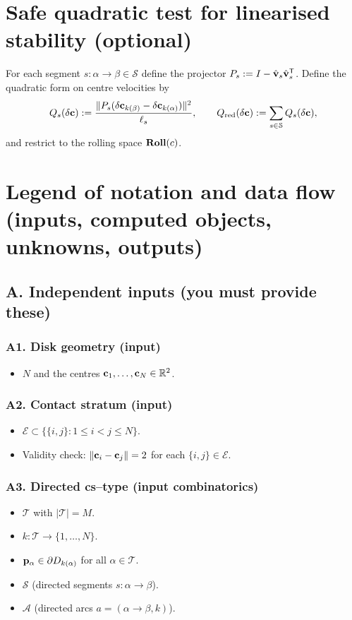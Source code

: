 \documentclass[12pt,letterpaper]{amsart}
\theoremstyle{definition}
\theoremstyle{remark}
\newcommand{\Roll}{\text{\rm \bf Roll}}
\newcommand{\R}{{\mathbb{R}}}
\begin{document}
\section{Safe quadratic test for linearised stability (optional)}

For each segment $s:\alpha\to\beta\in\mathcal S$ define the projector $P_s:=I-\hat{\bf v}_s\hat{\bf v}_s^\mathsf T$.
Define the quadratic form on centre velocities by
\[
Q_s(\delta{\bf c}):=\frac{\|P_s(\delta{\bf c}_{k(\beta)}-\delta{\bf c}_{k(\alpha)})\|^2}{\ell_s},
\qquad
Q_{\rm red}(\delta{\bf c}):=\sum_{s\in\mathcal S}Q_s(\delta{\bf c}),
\]
and restrict to the rolling space $\Roll(c)$.

\section{Legend of notation and data flow (inputs, computed objects, unknowns, outputs)}

\subsection{A. Independent inputs (you must provide these)}

\subsubsection*{A1. Disk geometry (input)}
\begin{itemize}
\item $N$ and the centres ${\bf c}_1,\dots,{\bf c}_N\in\R^2$.
\end{itemize}

\subsubsection*{A2. Contact stratum (input)}
\begin{itemize}
\item $\mathcal E\subset\{\{i,j\}:1\le i<j\le N\}$.
\item Validity check: $\|{\bf c}_i-{\bf c}_j\|=2$ for each $\{i,j\}\in\mathcal E$.
\end{itemize}

\subsubsection*{A3. Directed cs--type (input combinatorics)}
\begin{itemize}
\item $\mathcal T$ with $|\mathcal T|=M$.
\item $k:\mathcal T\to\{1,\dots,N\}$.
\item ${\bf p}_\alpha\in\partial D_{k(\alpha)}$ for all $\alpha\in\mathcal T$.
\item $\mathcal S$ (directed segments $s:\alpha\to\beta$).
\item $\mathcal A$ (directed arcs $a=(\alpha\to\beta,k)$).
\end{itemize}
\end{document}
